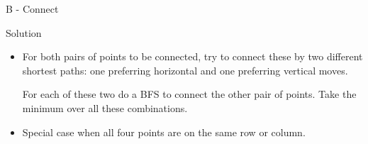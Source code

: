 \renewcommand{\insertshortauthor}{Problem Author: Jimmy M{\aa}rdell}
\begin{frame}{B - Connect}

\begin{block}{Solution}
  \begin{itemize}
    \item For both pairs of points to be connected, 
try to connect these by two different shortest paths: 
one preferring horizontal and one preferring vertical moves. 

For each of these two do a BFS to connect the other pair of points. 
Take the minimum over all these combinations.
 
    \item Special case when all four points are on the same row or column. 
  \end{itemize}
\end{block}

\end{frame}

